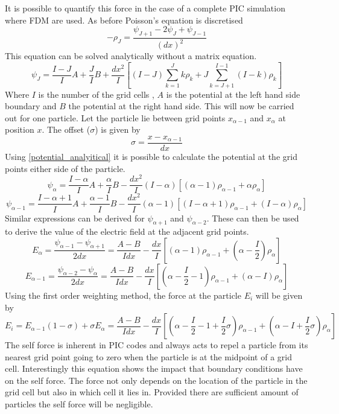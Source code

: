 \documentclass[12pt]{article}
\def\be{\begin{equation}}
\def\ee{\end{equation}}
\begin{document}
It is possible to quantify this force in the case of a complete PIC simulation where FDM are used. As before Poisson's equation is discretised 
\be 
-\rho_J = \frac{\psi_{J+1} - 2\psi_J + \psi_{J-1}}{(dx)^2}
\ee 
This equation can be solved analytically without a matrix equation.
\be 
\psi_J = \frac{I-J}{I} A + \frac{J}{I} B + \frac{dx^2}{I} \left[(I-J) \sum\limits_{k=1}^J k\rho_k   + J \sum\limits_{k=J+1}^{I-1} (I-k)\rho_k \right]
\label{potential_analyitical}
\ee
Where $I$ is the number of the grid cells , $A$ is the potential at the left hand side boundary and $B$ the potential at the right hand side. 
This will now be carried out for one particle. Let the particle lie between grid points $x_{\alpha -1}$ and $x_\alpha$ at position $x$. The offset ($\sigma$) is given by 
\be 
\sigma = \frac{x - x_{\alpha -1}}{dx}
\ee
Using \eqref{potential_analyitical} it is possible to calculate the potential at the grid points either side of the particle. 
\be
\psi_\alpha  = \frac{I-\alpha}{I}A +\frac{\alpha}{I}B - \frac{dx^2}{I}(I-\alpha) \left[(\alpha-1)\rho_{\alpha-1} + \alpha \rho_{\alpha} \right]
\ee
\be 
\psi_{\alpha -1} = \frac{I-\alpha +1}{I}A + \frac{\alpha - 1}{I} B -\frac{dx^2}{I}(\alpha -1) \left[(I-\alpha +1)\rho_{\alpha -1} + (I-\alpha)\rho_\alpha \right] 
\ee
Similar expressions can be derived for $\psi_{\alpha+1}$ and $\psi_{\alpha-2}$. These can then be used to derive the value of the electric field at the adjacent grid points. 
\be 
E_\alpha = \frac{\psi_{\alpha -1} - \psi_{\alpha +1}}{2 dx} = \frac{A-B}{I dx} - \frac{dx}{I}\left[(\alpha -1) \rho_{\alpha -1} + (\alpha -\frac{I}{2})\rho_\alpha \right]
\ee 
\be 
E_{\alpha-1} = \frac{\psi_{\alpha -2} - \psi_\alpha}{2 dx} = \frac{A-B}{I dx} - \frac{dx}{I} \left[(\alpha-\frac{I}{2}-1) \rho_{\alpha -1} +(\alpha-I) \rho_\alpha \right] 
\ee
Using the first order weighting method, the force at the particle $E_i$ will be given by 
\be 
E_i = E_{\alpha -1 } (1-\sigma) + \sigma E_\alpha = \frac{A - B}{I dx} - \frac{dx}{I} \left[(\alpha -\frac{I}{2} -1 + \frac{I}{2} \sigma) \rho_{\alpha -1} + (\alpha -I +\frac{I}{2} \sigma) \rho_\alpha \right]
\ee
The self force is inherent in PIC codes and always acts to repel a particle from its nearest grid point going to zero when the particle is at the midpoint of a grid cell. Interestingly this equation shows the impact that boundary conditions have on the self force. The force not only depends on the location of the particle in the grid cell but also in which cell it lies in. Provided there are sufficient amount of particles the self force will be negligible. 
\end{document}
